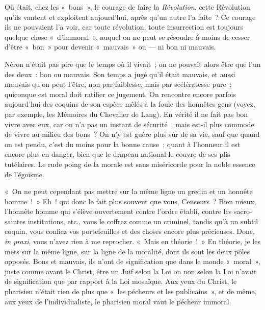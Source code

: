 \documentclass[french,twoside]{book} %
\begin{document}
Où était, chez les « bons », le courage de faire la \emph{Révolution}, cette Révolution qu’ils vantent et exploitent aujourd’hui, après qu’un autre l’a faite ? Ce courage  ils ne pouvaient l’a voir, car toute révolution, toute insurrection est toujours quelque chose « d’immoral », auquel on ne peut se résoudre à moins de cesser d’être « bon » pour devenir « mauvais » ou — ni bon ni mauvais.\par
Néron n’était pas pire que le temps où il vivait ; on ne pouvait alors être que l’un des deux : bon ou mauvais. Son temps a jugé qu’il était mauvais, et aussi mauvais qu’on peut l’être, non par faiblesse, mais par scélératesse pure ; quiconque est moral doit ratifier ce jugement. On rencontre encore parfois aujourd’hui des coquins de son espèce mêlés à la foule des honnêtes gens (voyez, par exemple, les Mémoires du Chevalier de Lang). En vérité il ne fait pas bon vivre avec eux, car on n’a pas un instant de sécurité ; mais est-il plus commode de vivre au milieu des bons ? On n’y est guère plus sûr de sa vie, sauf que quand on est pendu, c’est du moins pour la bonne cause ; quant à l’honneur il est encore plus en danger, bien que le drapeau national le couvre de ses plis tutélaires. Le rude poing de la morale est sans miséricorde pour la noble essence de l’égoïsme.\par
« On ne peut cependant pas mettre sur la même ligne un gredin et un honnête homme ! » Eh ! qui donc le fait plus souvent que vous, Censeurs ? Bien mieux, l’honnête homme qui s’élève ouvertement contre l’ordre établi, contre les sacro-saintes institutions, etc., vous le coffrez comme un criminel, tandis qu’à un subtil coquin, vous confiez vos portefeuilles et des choses encore plus précieuses. Donc, \emph{in praxi}, vous n’avez rien à me reprocher. « Mais en théorie ! » En théorie, je les mets sur la même ligne, sur la ligne de la moralité, dont ils sont les deux pôles opposés. Bons et mauvais, ils n’ont de signification que dans le monde « moral », juste comme avant le Christ, être un Juif selon la Loi on non selon la Loi n’avait de signification que par rapport à la Loi mosaïque. Aux yeux du Christ, le pharisien  n’était rien de plus que « les pécheurs et les publicains », et de même, aux yeux de l’individualiste, le pharisien moral vaut le pécheur immoral.\par
\end{document}
